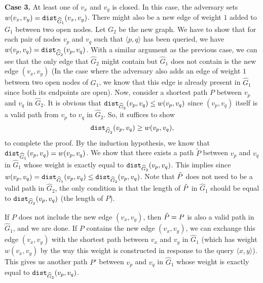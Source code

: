 \documentclass[11pt]{article}
\newcommand{\1}{\mathmybb{1}}
\newcommand{\dist}{\textnormal{\texttt{dist}}}
\begin{document}
    
    \medskip
    \noindent \textbf{Case 3.}
    At least one of $v_x$ and $v_y$ is closed.
    In this case, the adversary sets $w(v_x,v_y) = \dist_{\widehat G_1}(v_x,v_y)$.
    There might also be a new edge of weight $1$ added to $G_1$ between two open nodes.
    Let $G_2$ be the new graph.
    We have to show that for each pair of nodes $v_p$ and $v_q$ such that $\langle p,q \rangle$ has been queried, we have $w(v_p,v_q) = \dist_{\widehat G_2}(v_p,v_q)$.
    With a similar argument as the previous case, we can see that the only edge that $\widehat G_2$ might contain but $\widehat G_1$ does not contain is the new edge $(v_x,v_y)$ (In the case where the adversary also adds an edge of weight $1$ between two open nodes of $G_1$, we know that this edge is already present in $\widehat G_1$ since both its endpoints are open).
    Now, consider a shortest path $P$ between $v_p$ and $v_q$ in $\widehat G_2$.
    It is obvious that $\dist_{\widehat G_2}(v_p,v_q) \leq w(v_p,v_q)$ since $(v_p,v_q)$ itself is a valid path from $v_p$ to $v_q$ in $\widehat G_2$.
    So, it suffices to show
    \begin{equation}\label{eq:another-inequality}
        \dist_{\widehat G_2}(v_p,v_q) \geq w(v_p,v_q),
    \end{equation}
    to complete the proof.
    By the induction hypothesis, we know that $\dist_{\widehat G_1}(v_p,v_q) = w(v_p,v_q)$.
    We show that there exists a path $\tilde P$ between $v_p$ and $v_q$ in $\widehat G_1$ whose weight is exactly equal to $\dist_{\widehat G_2}(v_p,v_q)$. This implies  since $w(v_p,v_q) = \dist_{\widehat G_1}(v_p,v_q) \leq \dist_{\widehat G_2}(v_p,v_q)$.
    Note that $\Tilde{P}$ does not need to be a valid path in $\widehat G_2$, the only condition is that the length of $\Tilde{P}$ in $\widehat G_1$ should be equal to $\dist_{\widehat G_2}(v_p,v_q)$ (the length of $P$).
    
    If $P$ does not include the new edge $(v_x,v_y)$, then $\Tilde{P} = P$ is also a valid path in $\widehat G_1$, and we are done.
    If $P$ contains the new edge $(v_x,v_y)$, we can exchange this edge $(v_x,v_y)$ with the shortest path between $v_x$ and $v_y$ in $\widehat G_1$ (which has weight $w(v_x,v_y)$ by the way this weight is constructed in response to the query $\langle x,y \rangle$).
    This gives us another path $P'$ between $v_p$ and $v_q$ in $\widehat G_1$ whose weight is exactly equal to $\dist_{\widehat G_2}(v_p,v_q)$.
\end{document}
